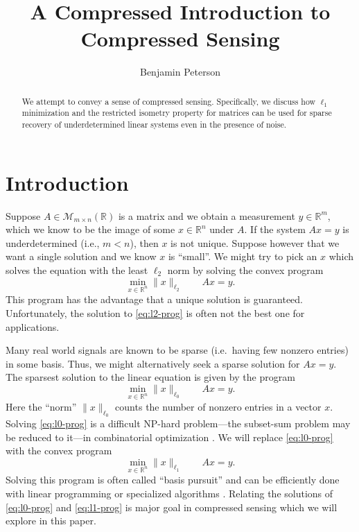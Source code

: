 \documentclass{article}
\title{A Compressed Introduction to Compressed Sensing}
\author{Benjamin Peterson}
\theoremstyle{definition}
\begin{document}
\maketitle

\begin{abstract}
We attempt to convey a sense of compressed sensing. Specifically, we discuss how $\ell_1$ minimization and the restricted isometry property for matrices can be used for sparse recovery of underdetermined linear systems even in the presence of noise.
\end{abstract}

\section{Introduction}
Suppose $A \in \mathcal{M}_{m\times n}(\mathbb{R})$ is a matrix and we obtain a measurement $y \in \mathbb{R}^m$, which we know to be the image of some $x \in \mathbb{R}^n$ under $A$. If the system $Ax = y$ is underdetermined (i.e., $m < n$), then $x$ is not unique. Suppose however that we want a single solution and we know $x$ is ``small''. We might try to pick an $x$ which solves the equation with the least $\ell_2$ norm by solving the convex program
\begin{equation}\label{eq:l2-prog}
\min_{x \in \mathbb{R}^n}\|x\|_{\ell_2}\qquad Ax = y.\tag{L}
\end{equation}
This program has the advantage that a unique solution is guaranteed. Unfortunately, the solution to \eqref{eq:l2-prog} is often not the best one for applications.

Many real world signals are known to be sparse (i.e.\ having few nonzero entries) in some basis. Thus, we might alternatively seek a sparse solution for $Ax = y$. The sparsest solution to the linear equation is given by the program
\begin{equation}\label{eq:l0-prog}
\min_{x\in \mathbb{R}^n} \|x\|_{\ell_0}\qquad Ax = y.\tag{S}
\end{equation}
Here the ``norm'' $\|x\|_{\ell_0}$ counts the number of nonzero entries in a vector $x$. Solving \eqref{eq:l0-prog} is a difficult NP-hard problem—the subset-sum problem may be reduced to it—in combinatorial optimization \cite{sparse-np}. We will replace \eqref{eq:l0-prog} with the convex program
\begin{equation}\label{eq:l1-prog}
\min_{x \in \mathbb{R}^n}\|x\|_{\ell_1}\qquad Ax = y.\tag{P}
\end{equation}
Solving this program is often called ``basis pursuit'' and can be efficiently done with linear programming or specialized algorithms \cite[ch. 15]{foucart-intro}. Relating the solutions of \eqref{eq:l0-prog} and \eqref{eq:l1-prog} is major goal in compressed sensing which we will explore in this paper.
\end{document}
